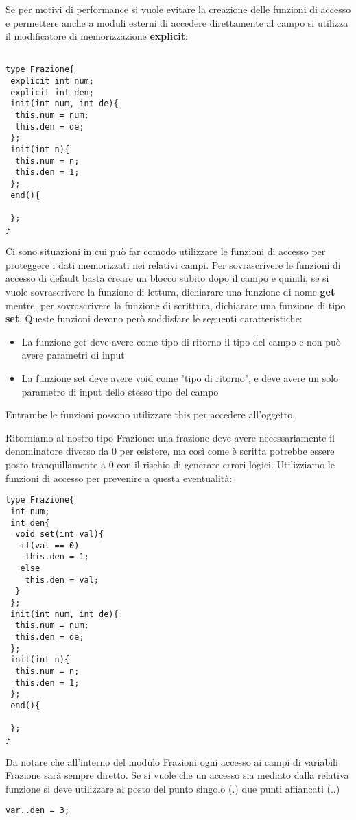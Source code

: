 \documentclass[10pt]{book}%
\newcommand{\e}{\`{e} }
\newcommand{\ac}[1]{\`{#1}}
\renewcommand{\emph}[1]{\textbf{#1}}
\newenvironment{codeenv}{
\begin{mdframed}[backgroundcolor=black!20,topline=false,leftline=false,rightline=false,bottomline=false]
}
{\end{mdframed}}
\begin{document}
Se per motivi di performance si vuole evitare la creazione delle funzioni di accesso e permettere anche a moduli esterni di accedere direttamente al campo si utilizza il modificatore di memorizzazione \emph{explicit}:
\begin{codeenv}
\begin{verbatim}

type Frazione{
 explicit int num;
 explicit int den;
 init(int num, int de){
  this.num = num;
  this.den = de;
 };
 init(int n){
  this.num = n;
  this.den = 1;
 };
 end(){
 
 };
}
\end{verbatim}
\end{codeenv}
Ci sono situazioni in cui pu\ac o far comodo utilizzare le funzioni di accesso per proteggere i dati memorizzati nei relativi campi. Per sovrascrivere le funzioni di accesso di default basta creare un blocco subito dopo il campo e quindi, se si vuole sovrascrivere la funzione di lettura, dichiarare una funzione di nome \emph{get} mentre, per sovrascrivere la funzione di scrittura, dichiarare una funzione di tipo \emph{set}. Queste funzioni devono per\ac o soddisfare le seguenti caratteristiche:
\begin{itemize}
\item La funzione get deve avere come tipo di ritorno il tipo del campo e non pu\ac o avere parametri di input
\item La funzione set deve avere void come "tipo di ritorno", e deve avere un solo parametro di input dello stesso tipo del campo
\end{itemize}
Entrambe le funzioni possono utilizzare this per accedere all'oggetto.

Ritorniamo al nostro tipo Frazione: una frazione deve avere necessariamente il denominatore diverso da 0 per esistere, ma cos\ac i come \e scritta potrebbe essere posto tranquillamente a 0 con il rischio di generare errori logici. Utilizziamo le funzioni di accesso per prevenire a questa eventualit\ac a:
\begin{codeenv}
\begin{verbatim}
type Frazione{
 int num;
 int den{
  void set(int val){
   if(val == 0)
    this.den = 1;
   else
    this.den = val;
  }
 };
 init(int num, int de){
  this.num = num;
  this.den = de;
 };
 init(int n){
  this.num = n;
  this.den = 1;
 };
 end(){
 
 };
}
\end{verbatim}
\end{codeenv}
Da notare che all'interno del modulo Frazioni ogni accesso ai campi di variabili Frazione sar\ac a sempre diretto. Se si vuole che un accesso sia mediato dalla relativa funzione si deve utilizzare al posto del punto singolo (.) due punti affiancati (..)
\begin{codeenv}
\begin{verbatim}
var..den = 3;
\end{verbatim}
\end{codeenv}
\end{document}
